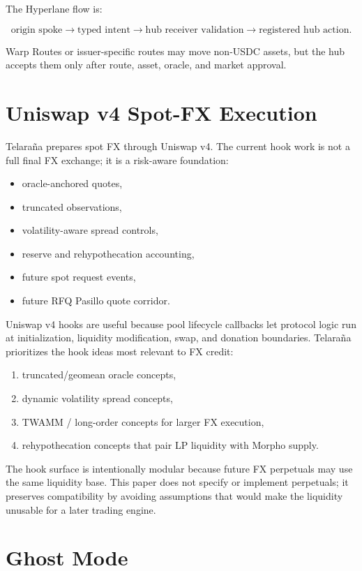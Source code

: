 \documentclass[11pt]{article}
\newcommand{\protocol}{Telara\~na}
\begin{document}
The Hyperlane flow is:

\[
\text{origin spoke} \rightarrow \text{typed intent} \rightarrow
\text{hub receiver validation} \rightarrow \text{registered hub action}.
\]

Warp Routes or issuer-specific routes may move non-USDC assets, but the hub
accepts them only after route, asset, oracle, and market approval.

\section{Uniswap v4 Spot-FX Execution}

\protocol{} prepares spot FX through Uniswap v4. The current hook work is not a
full final FX exchange; it is a risk-aware foundation:

\begin{itemize}
  \item oracle-anchored quotes,
  \item truncated observations,
  \item volatility-aware spread controls,
  \item reserve and rehypothecation accounting,
  \item future spot request events,
  \item future RFQ Pasillo quote corridor.
\end{itemize}

Uniswap v4 hooks are useful because pool lifecycle callbacks let protocol logic
run at initialization, liquidity modification, swap, and donation boundaries.
\protocol{} prioritizes the hook ideas most relevant to FX credit:

\begin{enumerate}
  \item truncated/geomean oracle concepts,
  \item dynamic volatility spread concepts,
  \item TWAMM / long-order concepts for larger FX execution,
  \item rehypothecation concepts that pair LP liquidity with Morpho supply.
\end{enumerate}

The hook surface is intentionally modular because future FX perpetuals may use
the same liquidity base. This paper does not specify or implement perpetuals;
it preserves compatibility by avoiding assumptions that would make the
liquidity unusable for a later trading engine.

\section{Ghost Mode}
\end{document}
